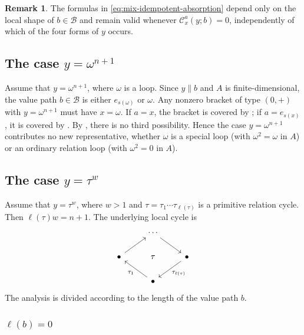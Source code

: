 \documentclass[11pt,a4paper,reqno]{amsart}
\newcommand{\mB}{\mathcal B}
\newcommand{\mC}{\mathcal C}
\newcommand{\taue}{\tau_{\ell(\tau)}}
\theoremstyle{plain}
\theoremstyle{definition}
\newtheorem{remark}[remark]{Remark}
\numberwithin{equation}{section}
\begin{document}
	\begin{remark}\label{rem:mixed-idempotent-absorption-general}
		The formulas in \eqref{eq:mix-idempotent-absorption} depend only on the local
		shape of $b\in\mB$ and remain valid whenever $\mC_x^a(y;b)=0$,
		independently of which of the four forms of $y$ occurs.
	\end{remark}
	\subsection{The case \texorpdfstring{$y=\omega^{n+1}$}{y = omega power n+1}}\label{subsec:mixed-loop-powers}
	
	Assume that
	$y=\omega^{n+1}$,
	where $\omega$ is a loop.  Since $y\parallel b$ and $A$ is finite-dimensional,
	the value path $b\in\mB$ is either $e_{s(\omega)}$ or $\omega$.  Any nonzero
	bracket of type $(0,+)$ with $y=\omega^{n+1}$ must have $x=\omega$.  If $a=x$, the bracket is covered by ; if
	$a=e_{s(x)}$, it is covered by .  By
	, there is no third possibility.  Hence the case $y=\omega^{n+1}$ contributes no new representative, whether $\omega$ is a special loop
	(with $\omega^2=\omega$ in $A$) or an ordinary relation loop (with
	$\omega^2=0$ in $A$).
	
	\subsection{The case \texorpdfstring{$y=\tau^w$}{y = tau power w}}\label{subsec:mixed-primitive-powers}
	
	Assume that $y=\tau^w$, where $w>1$ and
	$\tau=\tau_1\cdots\taue$ is a primitive relation cycle.  Then
	$\ell(\tau)w=n+1$.  The underlying local cycle is
	\[
	\begin{tikzcd}
		& \cdots & \\
		\bullet & \tau & \bullet \\
		& \bullet
		\arrow[from=1-2, to=2-3]
		\arrow[from=2-1, to=1-2]
		\arrow["\taue", from=2-3, to=3-2]
		\arrow["{\tau_1}", from=3-2, to=2-1]
	\end{tikzcd}
	\]
	The analysis is divided according to the length of the value path $b$.
	
	\subsubsection{$\ell(b)=0$}
	
\end{document}
